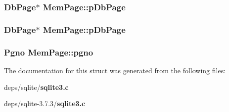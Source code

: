 \subsubsection{\setlength{\rightskip}{0pt plus 5cm}\bf{Db\-Page}$\ast$ \bf{Mem\-Page::p\-Db\-Page}}\label{structMemPage_a51075d21b277772413b8e3b8ecf2fb3}


\subsubsection{\setlength{\rightskip}{0pt plus 5cm}\bf{Db\-Page}$\ast$ \bf{Mem\-Page::p\-Db\-Page}}\label{structMemPage_a51075d21b277772413b8e3b8ecf2fb3}


\subsubsection{\setlength{\rightskip}{0pt plus 5cm}\bf{Pgno} \bf{Mem\-Page::pgno}}\label{structMemPage_0cf38a958b2dfc6c812b6a9ab910781a}




The documentation for this struct was generated from the following files:\begin{CompactItemize}
\item 
deps/sqlite/\bf{sqlite3.c}\item 
deps/sqlite-3.7.3/\bf{sqlite3.c}\end{CompactItemize}
